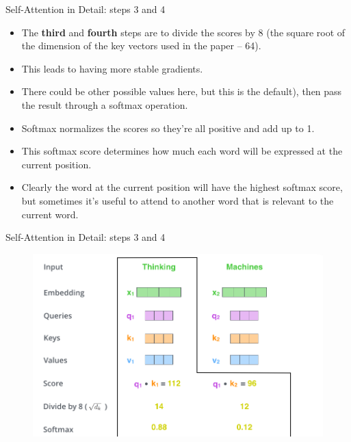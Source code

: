 \documentclass[handout]{beamer}
\begin{document}
\begin{frame}{Self-Attention in Detail: steps 3 and 4}
\begin{scriptsize}
\begin{itemize}


\item The \textbf{third} and \textbf{fourth} steps are to divide the scores by 8 (the square root of the dimension of the key vectors used in the paper – 64).

\item This leads to having more stable gradients. 

\item There could be other possible values here, but this is the default), then pass the result through a softmax operation. 

\item Softmax normalizes the scores so they’re all positive and add up to 1.

\item This softmax score determines how much each word will be expressed at the current position. 

\item Clearly the word at the current position will have the highest softmax score, but sometimes it’s useful to attend to another word that is relevant to the current word.

\end{itemize}

\end{scriptsize}


\end{frame}




\begin{frame}{Self-Attention in Detail: steps 3 and 4}


\begin{figure}[h]
        	\includegraphics[scale = 0.35]{pics/self-attention_softmax.png}
        \end{figure} 


\end{frame}
\end{document}
